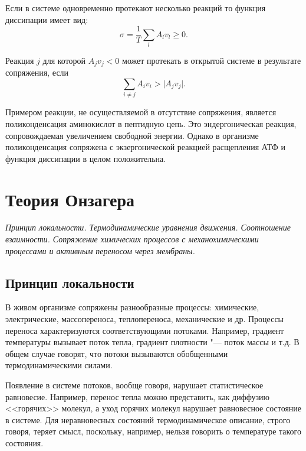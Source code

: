 \documentclass[12pt,a4paper,oneside]{book}
\begin{document}
Если в системе одновременно протекают несколько реакций то функция диссипации имеет вид:
\begin{equation} 
	 \sigma = \frac{1}{T} \sum_l A_l v_l \ge 0.
\end{equation}

Реакция $j$ для которой $A_j v_j < 0$ может протекать в открытой системе в результате сопряжения, если 
\begin{equation}
	\sum_{i \neq j} A_i v_i > \vert A_j v_j \vert.
\end{equation}

Примером реакции, не осуществляемой в отсутствие сопряжения, является поликонденсация аминокислот в пептидную цепь. Это эндергоническая реакция, сопровождаемая увеличением свободной  энергии. Однако в организме  поликонденсация сопряжена с экзергонической реакцией расщепления АТФ  и функция диссипации в целом положительна. 



\newpage
\section{Теория Онзагера}
{\it Принцип локальности. Термодинамические уравнения движения. Соотношение взаимности. Сопряжение химических процессов с механохимическими процессами и активным переносом через мембраны.}


\subsection{Принцип локальности}

В живом организме сопряжены разнообразные процессы: химические, электрические, массопереноса, теплопереноса, механические и др. Процессы переноса характеризуются соответствующими потоками. Например, градиент температуры вызывает поток тепла, градиент плотности "--- поток массы и т.д. В общем случае говорят, что потоки вызываются обобщенными термодинамическими силами. 

Появление в системе потоков, вообще говоря, нарушает статистическое равновесие. Например, перенос тепла можно представить, как диффузию <<горячих>> молекул, а уход горячих молекул нарушает равновесное состояние в системе. Для неравновесных состояний термодинамическое описание, строго говоря, теряет смысл, поскольку, например, нельзя говорить о температуре такого состояния. 
\end{document}

